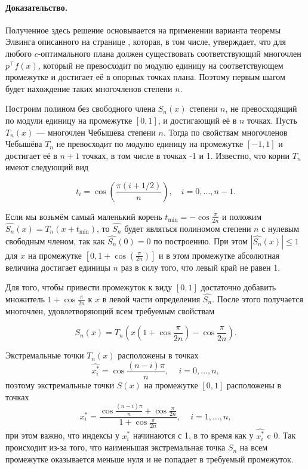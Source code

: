 \documentclass[specialist,
               substylefile = spbu.rtx,
               subf,href,colorlinks=true, 12pt]{disser}
\theoremstyle{definition}
\newcommand\abs[1]{\left\lvert#1\right\rvert}
\begin{document}
	\paragraph{Доказательство.}
	Полученное здесь решение основывается на применении варианта теоремы Элвинга описанного на странице \pageref{th:elfving}, которая, в том числе, утверждает, что для любого $c$-оптимального плана должен существовать соответствующий многочлен $p^\top f(x)$, который не превосходит по модулю единицу на соответствующем промежутке и достигает её в опорных точках плана. Поэтому первым шагом будет нахождение таких многочленов степени $n$.
	
	Построим полином без свободного члена $S_n(x)$ степени $n$, не превосходящий по модули единицу на промежутке $[0, 1]$, и достигающий её в $n$ точках. Пусть $T_n(x)$ --- многочлен Чебышёва степени $n$. Тогда по свойствам многочленов Чебышёва $T_n$ не превосходит по модулю единицу на промежутке $[-1, 1]$ и достигает её в $n+1$ точках, в том числе в точках -1 и 1. Известно, что корни $T_n$ имеют следующий вид
	
	\begin{equation*}
		t_{i}=\cos \left({\frac {\pi (i+1/2)}{n}}\right),\quad i=0,\ldots ,n-1.
	\end{equation*}	 
	
	Если мы возьмём самый маленький корень $t_{\text{min}} = - \cos \frac{\pi}{2n}$ и положим $\widehat{S_n}(x) = T_n(x + t_{\text{min}})$, то $\widehat{S_n}$ будет являться полиномом степени $n$ с нулевым свободным членом, так как $\widehat{S_n}(0) = 0$ по построению. При этом $\abs{\widehat{S_n}(x)} \leqslant 1$ для $x$ на промежутке $[0, 1+ \cos \left(\frac{\pi}{2n}\right)]$ и в этом промежутке абсолютная величина достигает единицы $n$ раз в силу того, что левый край не равен 1.
	
	Для того, чтобы привести промежуток к виду $[0, 1]$ достаточно добавить множитель $1 + \cos \frac{\pi}{2n}$  к $x$ в левой части определения $\widehat{S_n}$. После этого получается многочлен, удовлетворяющий всем требуемым свойствам
	
	\begin{equation*}
		S_n(x) = T_n \left(x \left(1 + \cos \frac{\pi}{2n} \right) - \cos \frac{\pi}{2n} \right).
	\end{equation*}	
	
	Экстремальные точки $T_n(x)$ расположены в точках
	\begin{equation*}
		\widehat{x_i^*} = \cos \frac{(n - i)\pi}{n}, \, \quad i = 0, \ldots, n,
	\end{equation*}
	поэтому экстремальные точки $S(x)$ на промежутке $[0, 1]$ расположены в точках
	\begin{equation*}
		x_i^* = \frac{\cos \frac{(n - i) \pi}{n} + \cos \frac{\pi}{2n}}{1 + \cos \frac{\pi}{2n}} , \, \quad i = 1, \ldots, n, 
	\end{equation*}
	при этом важно, что индексы у $x_i^*$ начинаются с 1, в то время как у $\widehat{x_i^*}$ c 0. Так происходит из-за того, что наименьшая экстремальная точка $S_n$ на всем промежутке оказывается меньше нуля и не попадает в требуемый промежуток.
	
\end{document}
